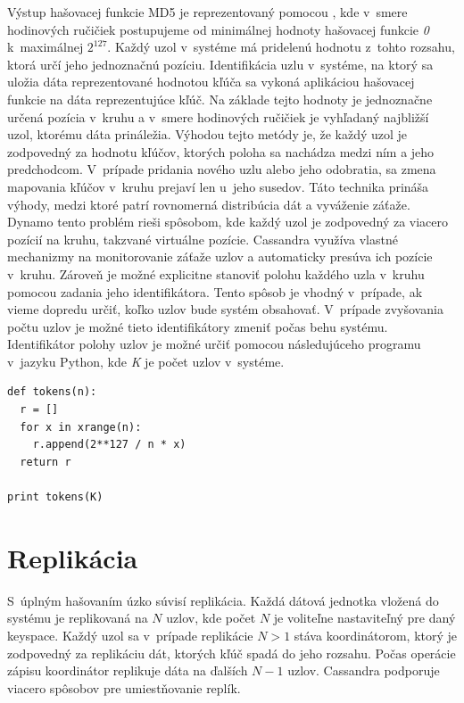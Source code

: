 \documentclass[11pt,twoside,a4paper]{book}
\begin{document}
Výstup hašovacej funkcie MD5 je reprezentovaný pomocou , kde v~smere hodinových ručičiek postupujeme od minimálnej hodnoty hašovacej funkcie \textit{0} k~maximálnej ${2^{127}}$. Každý uzol v~systéme má pridelenú hodnotu z~tohto rozsahu, ktorá určí jeho jednoznačnú pozíciu. Identifikácia uzlu v~systéme, na ktorý sa uložia dáta reprezentované hodnotou kľúča sa vykoná aplikáciou hašovacej funkcie na dáta reprezentujúce kľúč. Na základe tejto hodnoty je jednoznačne určená pozícia v~kruhu a v~smere hodinových ručičiek je vyhľadaný najbližší uzol, ktorému dáta prináležia. Výhodou tejto metódy je, že každý uzol je zodpovedný za hodnotu kľúčov, ktorých poloha sa nachádza medzi ním a jeho predchodcom. V~prípade pridania nového uzlu alebo jeho odobratia, sa zmena mapovania kľúčov v~kruhu prejaví len u~jeho susedov. Táto technika prináša výhody, medzi ktoré patrí rovnomerná distribúcia dát a vyváženie záťaže. Dynamo tento problém rieši spôsobom, kde každý uzol je zodpovedný za viacero pozícií na kruhu, takzvané virtuálne pozície. Cassandra využíva vlastné mechanizmy na monitorovanie záťaže uzlov a automaticky presúva ich pozície v~kruhu. Zároveň je možné explicitne stanoviť polohu každého uzla v~kruhu pomocou zadania jeho identifikátora. Tento spôsob je vhodný v~prípade, ak vieme dopredu určiť, koľko uzlov bude systém obsahovať. V~prípade zvyšovania počtu uzlov je možné tieto identifikátory zmeniť počas behu systému. Identifikátor polohy uzlov je možné určiť pomocou následujúceho programu v~jazyku Python, kde \emph{K} je počet uzlov v~systéme.

\begin{verbatim}
def tokens(n):
  r = []
  for x in xrange(n):
    r.append(2**127 / n * x)
  return r

print tokens(K)
\end{verbatim}




\section{Replikácia}

S~úplným hašovaním úzko súvisí replikácia. Každá dátová jednotka vložená do systému je replikovaná na $N$ uzlov, kde počet $N$ je voliteľne nastaviteľný pre daný keyspace. Každý uzol sa v~prípade replikácie $N > 1$ stáva koordinátorom, ktorý je zodpovedný za replikáciu dát, ktorých kľúč spadá do jeho rozsahu. Počas operácie zápisu koordinátor replikuje dáta na ďalších $N - 1$ uzlov. Cassandra podporuje viacero spôsobov pre umiestňovanie replík.
\end{document}
